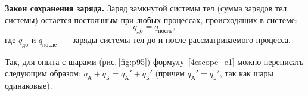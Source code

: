 \documentclass[main.tex]{subfiles}
\begin{document}
%
\begin{law}
    \textbf{Закон сохранения заряда.} Заряд замкнутой системы тел (сумма зарядов тел системы) остается постоянным при любых процессах, происходящих в системе:
    \begin{equation}
        \label{4escope_e1}
        q_\text{до}=q_\text{после},
    \end{equation}
    где $q_\text{до}$ и $q_\text{после}$~--- заряды системы тел до и после рассматриваемого процесса.
\end{law}
%
Так, для опыта с шарами (рис.\,\ref{fig:p95}) формулу~\eqref{4escope_e1} можно переписать следующим образом: $q_\text{А}^{\phantom{'}}+q_\text{Б}^{\phantom{'}}=q_\text{А}'+q_\text{Б}'$ (причем $q_\text{А}'=q_\text{Б}'$, так как шары одинаковые).








\end{document}
